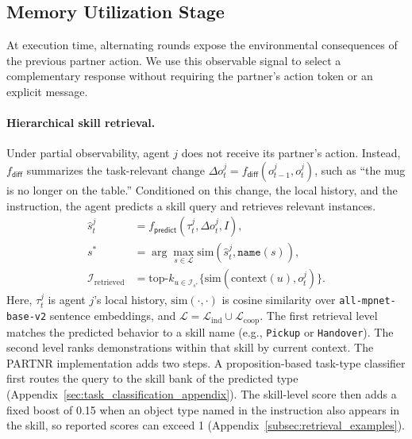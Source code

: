 \documentclass{article}
\theoremstyle{plain}
\theoremstyle{definition}
\theoremstyle{remark}
\begin{document}
\subsection{Memory Utilization Stage}
\label{subsec:utilization}
\label{subsec:memory_utilization}
 
At execution time, alternating rounds expose the environmental consequences of the previous partner action. We use this observable signal to select a complementary response without requiring the partner's action token or an explicit message.
 
\paragraph{Hierarchical skill retrieval.}
Under partial observability, agent $j$ does not receive its partner's action. Instead, $f_{\mathsf{diff}}$ summarizes the task-relevant change $\Delta o_t^j=f_{\mathsf{diff}}(o_{t-1}^j,o_t^j)$, such as ``the mug is no longer on the table.'' Conditioned on this change, the local history, and the instruction, the agent predicts a skill query and retrieves relevant instances.
\begin{equation}
\begin{aligned}
\hat{s}_t^j &= f_{\mathsf{predict}}(\tau_t^j, \Delta o_{t}^j, I), \\
s^* &= \arg\max_{s \in \mathcal{L}} \text{sim}(\hat{s}^j_t, \texttt{name}(s)), \\
\mathcal{I}_{\text{retrieved}} &= \text{top-}k_{u \in \mathcal{I}_{s^*}}
\{\text{sim}(\text{context}(u), o^j_t)\}.
\end{aligned}
\end{equation}
Here, $\tau_t^j$ is agent $j$'s local history, $\text{sim}(\cdot,\cdot)$ is cosine similarity over \texttt{all-mpnet-base-v2} sentence embeddings, and $\mathcal{L}=\mathcal{L}_{\text{ind}}\cup\mathcal{L}_{\text{coop}}$. The first retrieval level matches the predicted behavior to a skill name (e.g., \texttt{Pickup} or \texttt{Handover}). The second level ranks demonstrations within that skill by current context. The PARTNR implementation adds two steps. A proposition-based task-type classifier first routes the query to the skill bank of the predicted type (Appendix~\ref{sec:task_classification_appendix}). The skill-level score then adds a fixed boost of 0.15 when an object type named in the instruction also appears in the skill, so reported scores can exceed 1 (Appendix~\ref{subsec:retrieval_examples}).
 
\end{document}
